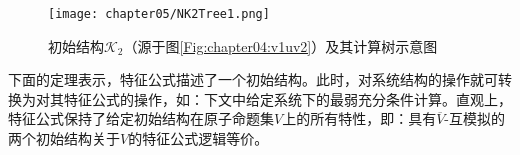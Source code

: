 \begin{example}
	
	
	\begin{figure*}
		\centering
		\texttt{[image: chapter05/NK2Tree1.png]}
		\caption{初始结构$\mathcal{K}_2$（源于图\ref{Fig:chapter04:v1uv2}）及其计算树示意图}\label{fig:K2Tree}
	\end{figure*}
	
	
\end{example}


下面的定理表示，特征公式描述了一个初始结构。此时，对系统结构的操作就可转换为对其特征公式的操作，如：下文中给定系统下的最弱充分条件计算。直观上，特征公式保持了给定初始结构在原子命题集$V$上的所有特性，即：具有$\overline{V}$-互模拟的两个初始结构关于$V$的特征公式逻辑等价。


